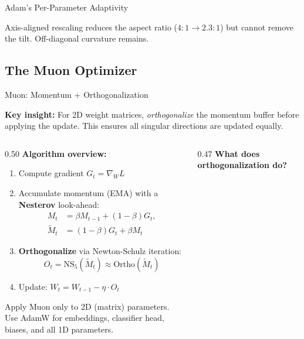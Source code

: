 \begin{frame}{Adam's Per-Parameter Adaptivity}
\begin{center}
  \vspace{0.2em}
  {\scriptsize Axis-aligned rescaling reduces the aspect ratio ($4{:}1 \to 2.3{:}1$) but cannot remove the tilt. Off-diagonal curvature remains.}
  \end{center}

\end{frame}

\subsection{The Muon Optimizer}

\begin{frame}{Muon: Momentum + Orthogonalization~\cite{jordan2024muon}}

  \textbf{Key insight:} For 2D weight matrices, \emph{orthogonalize} the momentum buffer before applying the update. This ensures all singular directions are updated equally.

  \vspace{0.4em}
  \begin{columns}[T]
    \begin{column}{0.50\textwidth}
      \textbf{Algorithm overview:}
      \begin{enumerate}
        \item Compute gradient $G_t = \nabla_W L$
        \item Accumulate momentum (EMA) with a \textbf{Nesterov} look-ahead:
        \[
          \begin{aligned}
            M_t &= \beta M_{t-1} + (1{-}\beta) G_t,\\
            \tilde{M}_t &= (1{-}\beta) G_t + \beta M_t
          \end{aligned}
        \]
        \item \textbf{Orthogonalize} via Newton-Schulz iteration:
        \[
          O_t = \text{NS}_5(\tilde{M}_t) \approx \text{Ortho}(\tilde{M}_t)
        \]
        \item Update: $W_t = W_{t-1} - \eta \cdot O_t$
      \end{enumerate}

      \vspace{0.3em}
      {\small Apply Muon only to 2D (matrix) parameters.\\
      Use AdamW for embeddings, classifier head, biases, and all 1D parameters.}
    \end{column}
    \begin{column}{0.47\textwidth}
      \textbf{What does orthogonalization do?}


\end{column}
\end{columns}
\end{frame}
